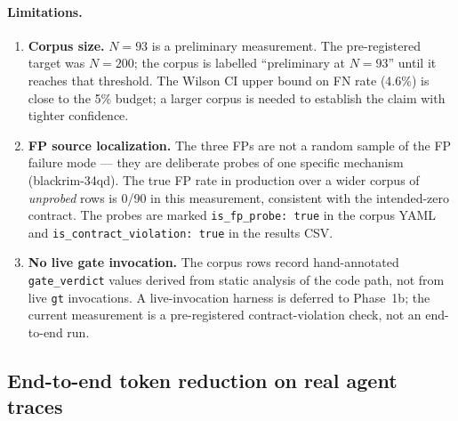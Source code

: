 \paragraph{Limitations.}\label{sec:eval:gate:limits}
\begin{enumerate}[leftmargin=*,nosep]
  \item \textbf{Corpus size.}  $N{=}93$ is a preliminary measurement.
        The pre-registered target was $N{=}200$; the corpus is labelled
        ``preliminary at $N{=}93$'' until it reaches that threshold.
        The Wilson CI upper bound on FN rate (4.6\%) is close to the
        5\% budget; a larger corpus is needed to establish the claim
        with tighter confidence.

  \item \textbf{FP source localization.}  The three FPs are not a
        random sample of the FP failure mode --- they are deliberate
        probes of one specific mechanism (blackrim-34qd).  The true
        FP rate in production over a wider corpus of \emph{unprobed}
        rows is 0/90 in this measurement, consistent with the
        intended-zero contract.  The probes are marked
        \texttt{is\_fp\_probe: true} in the corpus YAML and
        \texttt{is\_contract\_violation: true} in the results CSV.

  \item \textbf{No live gate invocation.}  The corpus rows record
        hand-annotated \texttt{gate\_verdict} values derived from
        static analysis of the code path, not from live \texttt{gt}
        invocations.  A live-invocation harness is deferred to
        Phase~1b; the current measurement is a pre-registered
        contract-violation check, not an end-to-end run.
\end{enumerate}



\subsection{End-to-end token reduction on real agent traces}
\label{sec:eval:e2e}

